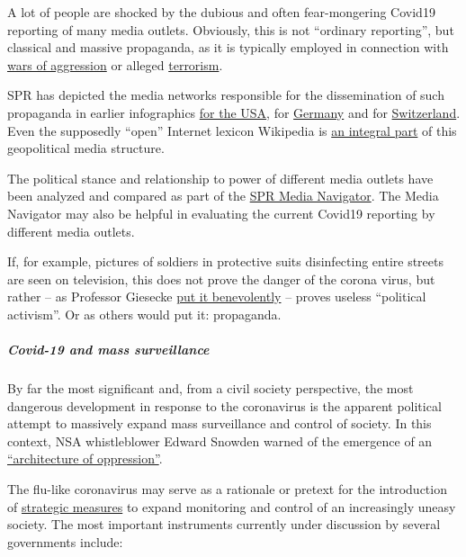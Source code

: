 A lot of people are shocked by the dubious and often fear-mongering
Covid19 reporting of many media outlets. Obviously, this is not
``ordinary reporting'', but classical and massive propaganda, as it is
typically employed in connection with
\href{https://swprs.org/propaganda-in-the-war-on-yugoslavia/}{wars of
aggression} or alleged
\href{https://www.motherjones.com/politics/2013/01/terror-factory-fbi-trevor-aaronson-book/}{terrorism}.

SPR has depicted the media networks responsible for the dissemination of
such propaganda in earlier infographics
\href{https://swprs.org/the-american-empire-and-its-media/}{for the
USA}, for \href{https://swprs.org/netzwerk-medien-deutschland/}{Germany}
and for \href{https://swprs.org/netzwerk-medien-schweiz/}{Switzerland}.
Even the supposedly ``open'' Internet lexicon Wikipedia is
\href{https://swprs.org/wikipedia-disinformation-operation/}{an integral
part} of this geopolitical media structure.

The political stance and relationship to power of different media
outlets have been analyzed and compared as part of the
\href{https://swprs.org/media-navigator/}{SPR Media Navigator}. The
Media Navigator may also be helpful in evaluating the current Covid19
reporting by different media outlets.

If, for example, pictures of soldiers in protective suits disinfecting
entire streets are seen on television, this does not prove the danger of
the corona virus, but rather -- as Professor Giesecke
\href{https://www.addendum.org/coronavirus/interview-johan-giesecke/}{put
it benevolently} -- proves useless ``political activism''. Or as others
would put it: propaganda.

\hypertarget{covid-19-and-mass-surveillance}{%
\subparagraph{\texorpdfstring{\textbf{Covid-19 and mass
surveillance}}{Covid-19 and mass surveillance}}\label{covid-19-and-mass-surveillance}}

By far the most significant and, from a civil society perspective, the
most dangerous development in response to the coronavirus is the
apparent political attempt to massively expand mass surveillance and
control of society. In this context, NSA whistleblower Edward Snowden
warned of the emergence of an
\href{https://www.vice.com/en_us/article/bvge5q/snowden-warns-governments-are-using-coronavirus-to-build-the-architecture-of-oppression}{``architecture
of oppression''}.

The flu-like coronavirus may serve as a rationale or pretext for the
introduction of
\href{https://norberthaering.de/die-regenten-der-welt/id2020-ktdi-apple-google/}{strategic
measures} to expand monitoring and control of an increasingly uneasy
society. The most important instruments currently under discussion by
several governments include:


